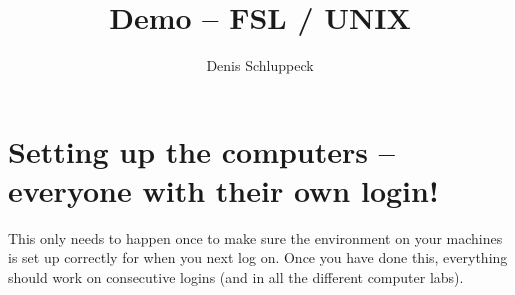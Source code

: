 % 


\title{Demo -- FSL / UNIX}
\author{Denis Schluppeck} %
\date{}                                           %

\newcommand{\lab}{1}
\newcommand{\cmd}{\texttt{cmd}}



\maketitle


\section{Setting up the computers -- everyone with their own login!}
This only needs to happen once to make sure the environment on your machines is set up correctly for when you next log on. Once you have done this, everything should work on consecutive logins (and in all the different computer labs). 

